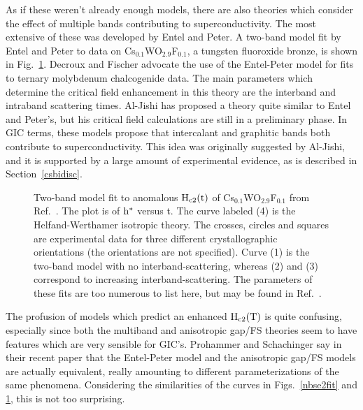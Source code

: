         As if these weren't already enough  models, there are also theories
which     consider the  effect   of   multiple    bands     contributing to
superconductivity.  The most extensive of these was developed by  Entel and
Peter.\cite{entel76} A two-band model  fit by Entel and  Peter to  data  on
Cs$_{0.1}$WO$_{2.9}$F$_{0.1}$,  a tungsten  fluoroxide  bronze,  is shown  in
Fig.~\ref{entelfit}.    Decroux and   Fischer   advocate   the use  of  the
Entel-Peter  model   for fits       to  ternary  molybdenum    chalcogenide
data.\cite{decroux82}  The main  parameters  which   determine the critical
field enhancement in this theory are the interband and intraband scattering
times.   Al-Jishi\cite{M143}  has proposed a  theory quite similar to Entel
and Peter's, but his critical field calculations are still in a preliminary
phase.   In GIC terms, these   models  propose  that  intercalant  and
graphitic bands   both contribute  to  superconductivity.   This   idea was
originally suggested by Al-Jishi,\cite{M143} and  it is supported by a large
amount of experimental evidence, as is described in Section~\ref{csbidisc}.

\begin{figure}
\vspace{5in}
\caption[Two-band model fit to anomalous $\rm H_{c2}(t)$ of
Cs$_{0.1}$WO$_{2.9}$F$_{0.1}$.]{Two-band  model  fit   to  anomalous   $\rm
H_{c2}(t)$ of Cs$_{0.1}$WO$_{2.9}$F$_{0.1}$  from  Ref.~\cite{entel77}. The
plot    is of  $\rm   h^*$  versus t.    The   curve labeled   (4)  is  the
Helfand-Werthamer  isotropic theory.  The crosses,  circles and squares are
experimental data  for three  different crystallographic  orientations (the
orientations are not specified).   Curve (1) is the  two-band model with no
interband-scattering,  whereas  (2)   and   (3) correspond  to   increasing
interband-scattering.   The parameters of  these  fits  are too numerous to
list here, but may be found in Ref.~\cite{entel77}.}
\label{entelfit}
\end{figure}

        The profusion of models which  predict an enhanced  $\rm H_{c2}(T)$
is quite confusing,  especially  since both the multiband  and  anisotropic
gap/FS theories seem  to have features  which are very  sensible for GIC's.
Prohammer and Schachinger say in  their recent paper\cite{prohammer87}  that
the   Entel-Peter model  and the  anisotropic gap/FS   models are  actually
equivalent, really amounting to different   parameterizations of  the  same
phenomena.    Considering  the   similarities    of    the   curves      in
Figs.~\ref{nbse2fit} and \ref{entelfit}, this is not too surprising.  


